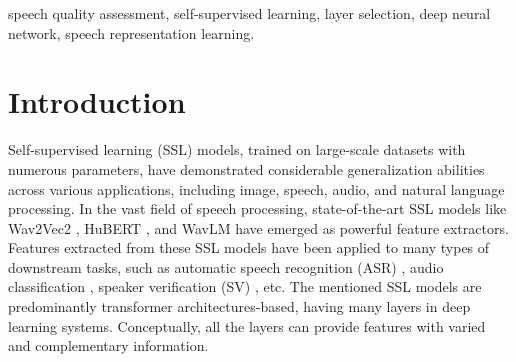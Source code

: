 \documentclass[conference]{IEEEtran}
\begin{document}
\maketitle

\begin{abstract}
Self-supervised learning (SSL) models like Wav2Vec2, HuBERT, and WavLM have been widely used in speech processing. These transformer-based models consist of multiple layers, each capturing different levels of representation. While prior studies explored their layer-wise representations for efficiency and performance, speech quality assessment (SQA) models predominantly rely on last-layer features, leaving intermediate layers underexamined. In this work, we systematically evaluate different layers of multiple SSL models for predicting mean-opinion-score (MOS). Features from each layer are fed into a lightweight regression network to assess effectiveness. Our experiments consistently show early-layers features outperform or match those from the last layer, leading to significant improvements over conventional approaches and state-of-the-art MOS prediction models. These findings highlight the advantages of early-layer selection, offering enhanced performance and reduced system complexity.

\end{abstract}

\begin{IEEEkeywords}
speech quality assessment, self-supervised learning, layer selection, deep neural network, speech representation learning.
\end{IEEEkeywords}

\section{Introduction}

Self-supervised learning (SSL) models, trained on large-scale datasets with numerous parameters, have demonstrated considerable generalization abilities across various applications, including image, speech, audio, and natural language processing. In the vast field of speech processing, state-of-the-art SSL models like Wav2Vec2 \cite{wav2vec2}, HuBERT \cite{hubert}, and WavLM \cite{wavlm} have emerged as powerful feature extractors. Features extracted from these SSL models have been applied to many types of downstream tasks, such as automatic speech recognition (ASR) \cite{ssl_asr}, audio classification \cite{ssl_ac}, speaker verification (SV) \cite{ssl_sv}, etc. The mentioned SSL models are predominantly transformer architectures-based, having many layers in deep learning systems. Conceptually, all the layers can provide features with varied and complementary information.
\end{document}
